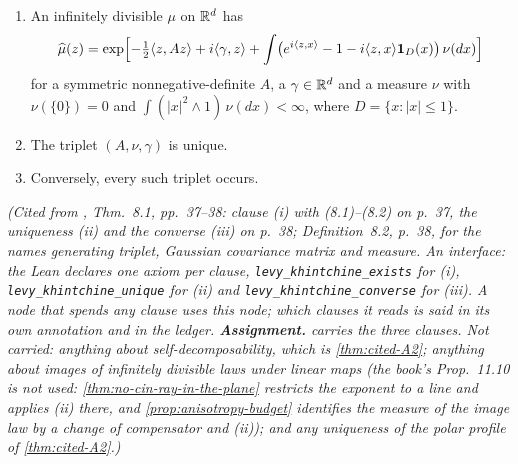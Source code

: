 \begin{theorem}
\label{thm:cited-A3}
\leanok
\begin{enumerate}
\item[(i)] An infinitely divisible $\mu$ on $\mathbb{R}^d$ has
\[
  \widehat\mu(z)=\exp\Bigl[-\tfrac12\langle z,Az\rangle+i\langle\gamma,z\rangle
  +\int\bigl(e^{i\langle z,x\rangle}-1-i\langle z,x\rangle\mathbf 1_D(x)\bigr)\,\nu(dx)\Bigr]
\]
for a symmetric nonnegative-definite $A$, a $\gamma\in\mathbb{R}^d$ and a measure $\nu$ with
$\nu(\{0\})=0$ and $\int(|x|^2\wedge1)\,\nu(dx)<\infty$, where $D = \{x : |x| \le 1\}$.
\item[(ii)] The triplet $(A,\nu,\gamma)$ is unique.
\item[(iii)] Conversely, every such triplet occurs.
\end{enumerate}
\statusA\quad{}\quad\emph{(Cited from , Thm.~8.1, pp.~37--38:
clause (i) with (8.1)--(8.2) on p.~37, the uniqueness (ii) and the converse (iii) on p.~38;
Definition~8.2, p.~38, for the names \emph{generating triplet}, \emph{Gaussian covariance matrix}
and \emph{\Levy{} measure}. An interface: the Lean declares one axiom per clause,
\texttt{levy\_khintchine\_exists} for (i), \texttt{levy\_khintchine\_unique} for (ii) and
\texttt{levy\_khintchine\_converse} for (iii). A node that spends any clause uses this node; which
clauses it reads is said in its own annotation and in the ledger. \textbf{Assignment.}
 carries the three clauses. Not carried: anything about self-decomposability, which is
\ref{thm:cited-A2}; anything about images of infinitely divisible laws under linear maps (the
book's Prop.~11.10 is not used: \ref{thm:no-cin-ray-in-the-plane} restricts the exponent to a line
and applies (ii) there, and \ref{prop:anisotropy-budget} identifies the \Levy{} measure of the image
law by a change of compensator and (ii)); and any uniqueness of the polar profile of \ref{thm:cited-A2}.)}
\end{theorem}

